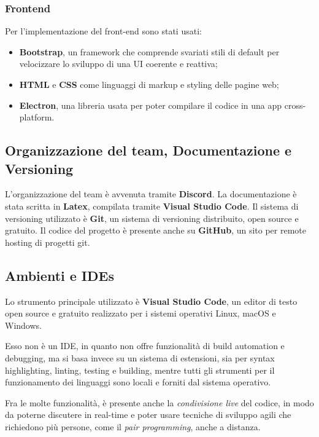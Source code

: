 \subsubsection{Frontend} Per l'implementazione del front-end sono stati usati:
\begin{itemize}
    \item \textbf{Bootstrap}, un framework che comprende svariati stili di default per
    velocizzare lo sviluppo di una UI coerente e reattiva;
    \item \textbf{HTML} e \textbf{CSS} come linguaggi di markup e styling delle pagine web;
    \item \textbf{Electron}, una libreria usata per poter compilare il codice 
     in una app cross-platform.
\end{itemize}

\vspace{5pt}
\subsection{Organizzazione del team, Documentazione e Versioning}
L'organizzazione del team è avvenuta tramite \textbf{Discord}.
La documentazione è stata scritta in \textbf{Latex}, compilata tramite \textbf{Visual Studio Code}.
Il sistema di versioning utilizzato è \textbf{Git}, un sistema di versioning distribuito,
open source e gratuito. Il codice del progetto è presente anche su \textbf{GitHub}, un sito per remote hosting
di progetti git.


\vspace{5pt}
\subsection{Ambienti e IDEs}
Lo strumento principale utilizzato è \textbf{Visual Studio Code}, un editor di
testo open source e gratuito realizzato per i sistemi operativi Linux, macOS
e Windows.

Esso non è un IDE, in quanto non offre funzionalità di build automation
e debugging, ma si basa invece su un sistema di estensioni, sia per syntax
highlighting, linting, testing e building, mentre tutti gli strumenti per il
funzionamento dei linguaggi sono locali e forniti dal sistema operativo.

Fra le molte funzionalità, è presente anche la \textit{condivisione live} del codice, in
modo da poterne discutere in real-time e poter usare tecniche di sviluppo
agili che richiedono più persone, come il \textit{pair programming}, anche a distanza.


